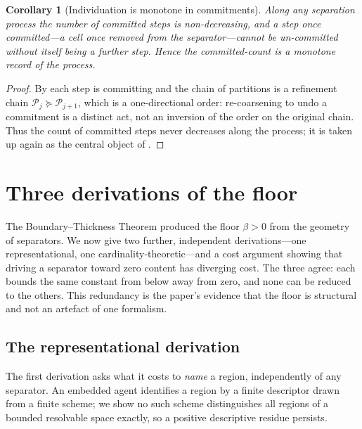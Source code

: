\documentclass[11pt,a4paper]{article}
\theoremstyle{thmstyle}
\newtheorem{corollary}[theorem]{Corollary}
\theoremstyle{definition}
\theoremstyle{remark}
\newcommand{\thick}{\beta}
\newcommand{\Part}{\mathscr{P}}
\begin{document}
\begin{corollary}[Individuation is monotone in commitments]
\label{cor:monotone-commit}
Along any separation process the number of committed steps is non-decreasing, and
a step once committed---a cell once removed from the separator---cannot be
un-committed without itself being a further step. Hence the committed-count is a
monotone record of the process.
\end{corollary}

\begin{proof}
By  each step is committing and the chain of partitions is a
refinement chain $\Part_j\succeq\Part_{j+1}$, which is a one-directional order:
re-coarsening to undo a commitment is a distinct act, not an inversion of the
order on the original chain. Thus the count of committed steps never decreases
along the process; it is taken up again as the central object of
.
\end{proof}


\section{Three derivations of the floor}
\label{sec:floor}

The Boundary--Thickness Theorem produced the floor $\thick>0$ from the geometry
of separators. We now give two further, independent derivations---one
representational, one cardinality-theoretic---and a cost argument showing that
driving a separator toward zero content has diverging cost. The three agree:
each bounds the same constant from below away from zero, and none can be reduced
to the others. This redundancy is the paper's evidence that the floor is
structural and not an artefact of one formalism.

\subsection{The representational derivation}

The first derivation asks what it costs to \emph{name} a region, independently of
any separator. An embedded agent identifies a region by a finite descriptor
drawn from a finite scheme; we show no such scheme distinguishes all regions of
a bounded resolvable space exactly, so a positive descriptive residue persists.
\end{document}
